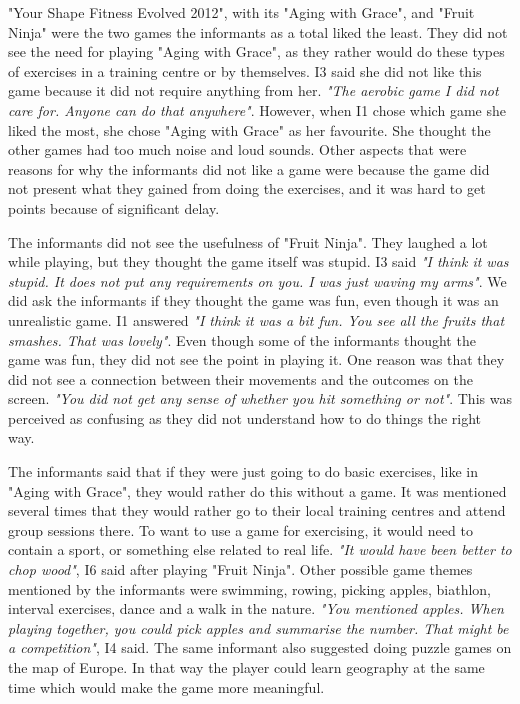 "Your Shape Fitness Evolved 2012", with its "Aging with Grace", and "Fruit Ninja" were the two games the informants as a total liked the least. They did not see the need for playing "Aging with Grace", as they rather would do these types of exercises in a training centre or by themselves. I3 said she did not like this game because it did not require anything from her. \emph{"The aerobic game I did not care for. Anyone can do that anywhere"}. However, when I1 chose which game she liked the most, she chose "Aging with Grace" as her favourite. She thought the other games had too much noise and loud sounds. Other aspects that were reasons for why the informants did not like a game were because the game did not present what they gained from doing the exercises, and it was hard to get points because of significant delay. 

The informants did not see the usefulness of "Fruit Ninja". They laughed a lot while playing, but they thought the game itself was stupid. I3 said \emph{"I think it was stupid. It does not put any requirements on you. I was just waving my arms"}. We did ask the informants if they thought the game was fun, even though it was an unrealistic game. I1 answered \emph{"I think it was a bit fun. You see all the fruits that smashes. That was lovely"}. Even though some of the informants thought the game was fun, they did not see the point in playing it. One reason was that they did not see a connection between their movements and the outcomes on the screen. \emph{"You did not get any sense of whether you hit something or not"}. This was perceived as confusing as they did not understand how to do things the right way. 

The informants said that if they were just going to do basic exercises, like in "Aging with Grace", they would rather do this without a game. It was mentioned several times that they would rather go to their local training centres and attend group sessions there. To want to use a game for exercising, it would need to contain a sport, or something else related to real life. \emph{"It would have been better to chop wood"}, I6 said after playing "Fruit Ninja". Other possible game themes mentioned by the informants were swimming, rowing, picking apples, biathlon, interval exercises, dance and a walk in the nature. \emph{"You mentioned apples. When playing together, you could pick apples and summarise the number. That might be a competition"}, I4 said. The same informant also suggested doing puzzle games on the map of Europe. In that way the player could learn geography at the same time which would make the game more meaningful.

